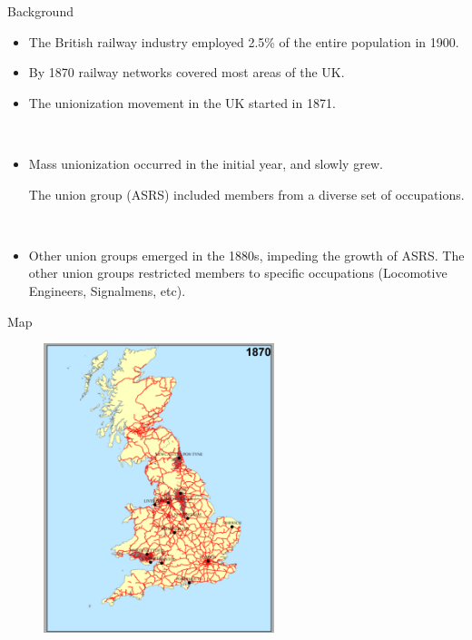 \begin{frame}{Background}
\begin{itemize}
    \item The British railway industry employed 2.5\% of the entire population in 1900.

    \item By 1870 railway networks covered most areas of the UK.
    
    \item The unionization movement in the UK started in 1871.

    \

    \item Mass unionization occurred in the initial year, and slowly grew.
    
    The union group (ASRS) included members from a diverse set of occupations.

    \

    \item Other union groups emerged in the 1880s, impeding the growth of ASRS.
    The other union groups restricted members to specific occupations (Locomotive Engineers, Signalmens, etc).
\end{itemize}
    
\end{frame}

\begin{frame}{Map}
    \begin{figure}
        \centering
        \includegraphics[width = 0.6\textwidth]{Background/Map.png}
        \label{fig:enter-label}
    \end{figure}
\end{frame}